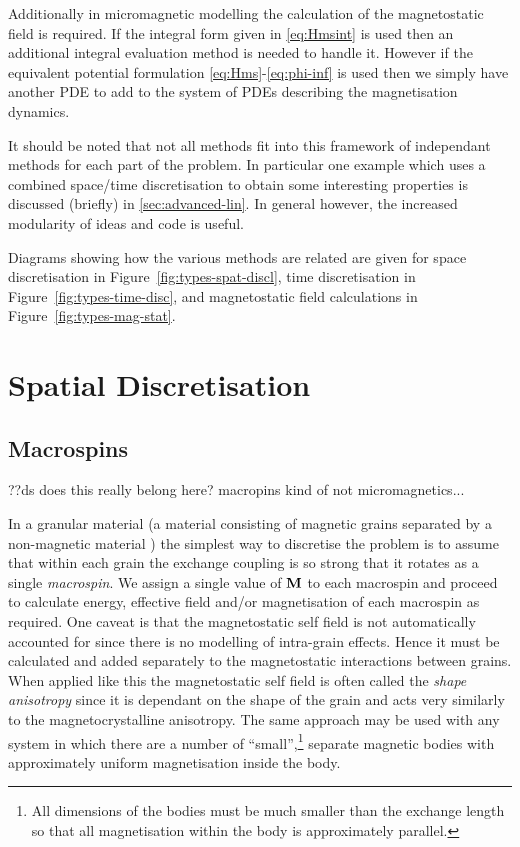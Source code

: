 Additionally in micromagnetic modelling the calculation of the magnetostatic field is required.
If the integral form given in \eqref{eq:Hmsint} is used then an additional integral evaluation method is needed to handle it.
However if the equivalent potential formulation \eqref{eq:Hms}-\eqref{eq:phi-inf} is used then we simply have another PDE to add to the system of PDEs describing the magnetisation dynamics.

It should be noted that not all methods fit into this framework of independant methods for each part of the problem.
In particular one example which uses a combined space/time discretisation to obtain some interesting properties is discussed (briefly) in \autoref{sec:advanced-lin}.
In general however, the increased modularity of ideas and code is useful.

Diagrams showing how the various methods are related are given for space discretisation in Figure~\ref{fig:types-spat-discl}, time discretisation in Figure~\ref{fig:types-time-disc}, and magnetostatic field calculations in Figure~\ref{fig:types-mag-stat}.

\section{Spatial Discretisation}
\label{sec:spat-discr}

\subsection{Macrospins}
\label{sec:sd-macrospins}

??ds does this really belong here? macropins kind of not micromagnetics...

In a granular material (a material consisting of magnetic grains separated by a non-magnetic material%
) the simplest way to discretise the problem is to assume that within each grain the exchange coupling is so strong that it rotates as a single \emph{macrospin}. We assign a single value of $\mathbf{M}$ to each macrospin and proceed to calculate energy, effective field and/or magnetisation of each macrospin as required. One caveat is that the magnetostatic self field is not automatically accounted for since there is no modelling of intra-grain effects. Hence it must be calculated and added separately to the magnetostatic interactions between grains. When applied like this the magnetostatic self field is often called the \emph{shape anisotropy} since it is dependant on the shape of the grain and acts very similarly to the magnetocrystalline anisotropy. The same approach may be used with any system in which there are a number of ``small'',\footnote{All dimensions of the bodies must be much smaller than the exchange length so that all magnetisation within the body is approximately parallel.} separate magnetic bodies with approximately uniform magnetisation inside the body.

